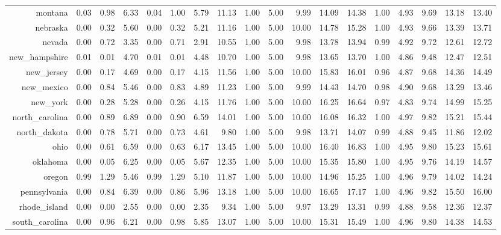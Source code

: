 \documentclass{article} %
\begin{document}
\begin{table}[ht]
\begin{tabular}{rrrrrrrrrrrrrrrrrr}
  montana & 0.03 & 0.98 & 6.33 & 0.04 & 1.00 & 5.79 & 11.13 & 1.00 & 5.00 & 9.99 & 14.09 & 14.38 & 1.00 & 4.93 & 9.69 & 13.18 & 13.40 \\
  nebraska & 0.00 & 0.32 & 5.60 & 0.00 & 0.32 & 5.21 & 11.16 & 1.00 & 5.00 & 10.00 & 14.78 & 15.28 & 1.00 & 4.93 & 9.66 & 13.39 & 13.71 \\
  nevada & 0.00 & 0.72 & 3.35 & 0.00 & 0.71 & 2.91 & 10.55 & 1.00 & 5.00 & 9.98 & 13.78 & 13.94 & 0.99 & 4.92 & 9.72 & 12.61 & 12.72 \\
  new\_hampshire & 0.01 & 0.01 & 4.70 & 0.01 & 0.01 & 4.48 & 10.70 & 1.00 & 5.00 & 9.98 & 13.65 & 13.70 & 1.00 & 4.86 & 9.48 & 12.47 & 12.51 \\
  new\_jersey & 0.00 & 0.17 & 4.69 & 0.00 & 0.17 & 4.15 & 11.56 & 1.00 & 5.00 & 10.00 & 15.83 & 16.01 & 0.96 & 4.87 & 9.68 & 14.36 & 14.49 \\
  new\_mexico & 0.00 & 0.84 & 5.46 & 0.00 & 0.83 & 4.89 & 11.23 & 1.00 & 5.00 & 9.99 & 14.43 & 14.70 & 0.98 & 4.90 & 9.68 & 13.29 & 13.46 \\
  new\_york & 0.00 & 0.28 & 5.28 & 0.00 & 0.26 & 4.15 & 11.76 & 1.00 & 5.00 & 10.00 & 16.25 & 16.64 & 0.97 & 4.83 & 9.74 & 14.99 & 15.25 \\
  north\_carolina & 0.00 & 0.89 & 6.89 & 0.00 & 0.90 & 6.59 & 14.01 & 1.00 & 5.00 & 10.00 & 16.08 & 16.32 & 1.00 & 4.97 & 9.82 & 15.21 & 15.44 \\
  north\_dakota & 0.00 & 0.78 & 5.71 & 0.00 & 0.73 & 4.61 & 9.80 & 1.00 & 5.00 & 9.98 & 13.71 & 14.07 & 0.99 & 4.88 & 9.45 & 11.86 & 12.02 \\
  ohio & 0.00 & 0.61 & 6.59 & 0.00 & 0.63 & 6.17 & 13.45 & 1.00 & 5.00 & 10.00 & 16.40 & 16.83 & 1.00 & 4.95 & 9.80 & 15.23 & 15.61 \\
  oklahoma & 0.00 & 0.05 & 6.25 & 0.00 & 0.05 & 5.67 & 12.35 & 1.00 & 5.00 & 10.00 & 15.35 & 15.80 & 1.00 & 4.95 & 9.76 & 14.19 & 14.57 \\
  oregon & 0.99 & 1.29 & 5.46 & 0.99 & 1.29 & 5.10 & 11.87 & 1.00 & 5.00 & 10.00 & 14.96 & 15.25 & 1.00 & 4.96 & 9.79 & 14.02 & 14.24 \\
  pennsylvania & 0.00 & 0.84 & 6.39 & 0.00 & 0.86 & 5.96 & 13.18 & 1.00 & 5.00 & 10.00 & 16.65 & 17.17 & 1.00 & 4.96 & 9.82 & 15.50 & 16.00 \\
  rhode\_island & 0.00 & 0.00 & 2.55 & 0.00 & 0.00 & 2.35 & 9.34 & 1.00 & 5.00 & 9.97 & 13.29 & 13.31 & 0.99 & 4.88 & 9.58 & 12.36 & 12.37 \\
  south\_carolina & 0.00 & 0.96 & 6.21 & 0.00 & 0.98 & 5.85 & 13.07 & 1.00 & 5.00 & 10.00 & 15.31 & 15.49 & 1.00 & 4.96 & 9.80 & 14.38 & 14.53 \\

\end{tabular}
\end{table}
\end{document}
